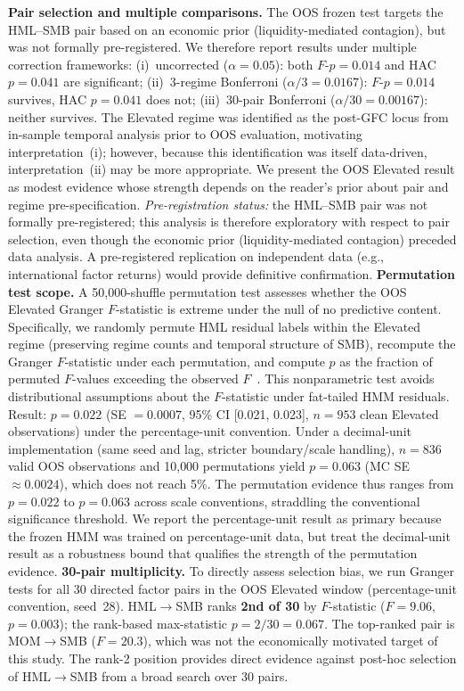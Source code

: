 \documentclass[sigconf,anonymous]{acmart}
\begin{document}
\textbf{Pair selection and multiple comparisons.} The OOS frozen test targets
the HML--SMB pair based on an economic prior (liquidity-mediated contagion),
but was not formally pre-registered. We therefore report results under
multiple correction frameworks:
(i)~uncorrected ($\alpha = 0.05$): both $F$-$p = 0.014$ and HAC $p = 0.041$ are significant;
(ii)~3-regime Bonferroni ($\alpha/3 = 0.0167$): $F$-$p = 0.014$ survives, HAC $p = 0.041$ does not;
(iii)~30-pair Bonferroni ($\alpha/30 = 0.00167$): neither survives.
The Elevated regime was identified as the post-GFC locus from in-sample temporal
analysis prior to OOS evaluation, motivating interpretation~(i); however, because
this identification was itself data-driven, interpretation~(ii) may be more
appropriate. We present the OOS Elevated result as modest evidence whose
strength depends on the reader's prior about pair and regime pre-specification.
\emph{Pre-registration status:} the HML--SMB pair was not formally pre-registered;
this analysis is therefore exploratory with respect to pair selection, even
though the economic prior (liquidity-mediated contagion) preceded data analysis.
A pre-registered replication on independent data (e.g., international factor
returns) would provide definitive confirmation.
\textbf{Permutation test scope.} A 50{,}000-shuffle permutation test
assesses whether the OOS Elevated Granger $F$-statistic is extreme under the null
of no predictive content. Specifically, we randomly permute HML residual labels
within the Elevated regime (preserving regime counts and temporal structure of
SMB), recompute the Granger $F$-statistic under each permutation, and compute
$p$ as the fraction of permuted $F$-values exceeding the observed
$F$~\cite{good2005permutation}. This nonparametric test avoids distributional
assumptions about the $F$-statistic under fat-tailed HMM residuals.
Result: $p = 0.022$ (SE $= 0.0007$, 95\% CI [0.021, 0.023], $n = 953$ clean Elevated observations)
under the percentage-unit convention.
Under a decimal-unit implementation (same seed and lag, stricter boundary/scale handling),
$n = 836$ valid OOS observations and 10{,}000 permutations yield $p = 0.063$
(MC SE $\approx 0.0024$), which does not reach 5\%.
The permutation evidence thus ranges from $p = 0.022$ to $p = 0.063$ across scale
conventions, straddling the conventional significance threshold.
We report the percentage-unit result as primary because the frozen HMM was trained
on percentage-unit data, but treat the decimal-unit result as a robustness bound
that qualifies the strength of the permutation evidence.
\textbf{30-pair multiplicity.} To directly assess selection bias, we run Granger
tests for all 30 directed factor pairs in the OOS Elevated window (percentage-unit
convention, seed~28). HML$\to$SMB ranks \textbf{2nd of 30} by $F$-statistic
($F = 9.06$, $p = 0.003$); the rank-based max-statistic $p = 2/30 = 0.067$.
The top-ranked pair is MOM$\to$SMB ($F = 20.3$), which was not the
economically motivated target of this study.
The rank-2 position provides direct evidence against post-hoc selection of HML$\to$SMB
from a broad search over 30 pairs.
\end{document}
